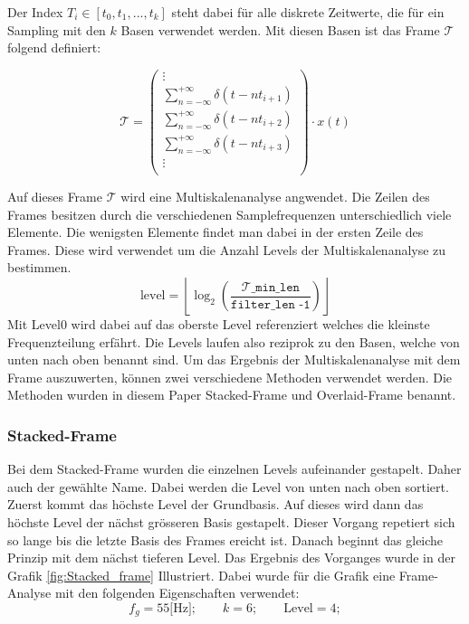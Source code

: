 Der Index $T_{i}\in[t_{0},t_{1},...,t_{k}]$ steht dabei für alle diskrete Zeitwerte, die für ein Sampling mit den $k$ Basen verwendet werden. Mit diesen Basen ist das Frame $\mathcal{T}$ folgend definiert:

\[
\mathcal{T}
=
\begin{pmatrix}
\vdots\\
\displaystyle\sum_{n=-\infty}^{+\infty} \delta(t - nt_{i+1})\\[1mm]
\displaystyle\sum_{n=-\infty}^{+\infty} \delta(t - nt_{i+2})\\[1mm]
\displaystyle\sum_{n=-\infty}^{+\infty} \delta(t - nt_{i+3})\\[1mm]
\vdots\\
\end{pmatrix}
\cdot x(t)
\]


Auf dieses Frame $\mathcal{T}$ wird eine Multiskalenanalyse angwendet. Die Zeilen des Frames besitzen durch die verschiedenen Samplefrequenzen unterschiedlich viele Elemente. Die wenigsten Elemente findet man dabei in der ersten Zeile des Frames. Diese wird verwendet um die Anzahl Levels der Multiskalenanalyse zu bestimmen. 
\[\text{level} = \left\lfloor\log_2\left(\mathtt{
	\frac{\mathcal{T}\_\text{min\_len}}{\text{filter\_len -1}}}\right)\right\rfloor
\]
Mit Level0 wird dabei auf das oberste Level referenziert welches die kleinste Frequenzteilung erfährt. Die Levels laufen also reziprok zu den Basen, welche von unten nach oben benannt sind. Um das Ergebnis der Multiskalenanalyse mit dem Frame auszuwerten, können zwei verschiedene Methoden verwendet werden. Die Methoden wurden in diesem Paper Stacked-Frame und Overlaid-Frame benannt. 

\newpage


\subsubsection{Stacked-Frame} 

Bei dem Stacked-Frame wurden die einzelnen Levels aufeinander gestapelt. Daher auch der gewählte Name. Dabei werden die Level von unten nach oben sortiert. Zuerst kommt das höchste Level der Grundbasis. Auf dieses wird dann das höchste Level der nächst grösseren Basis gestapelt. Dieser Vorgang repetiert sich so lange bis die letzte Basis des Frames ereicht ist. Danach beginnt das gleiche Prinzip mit dem nächst tieferen Level. Das Ergebnis des Vorganges wurde in der Grafik \ref{fig:Stacked_frame} Illustriert. Dabei wurde für die Grafik eine Frame-Analyse mit den folgenden Eigenschaften verwendet:
\[
f_{g}=55\text{[Hz]}; \qquad
k = 6 ; \qquad
\text{Level}= 4;
\] 



